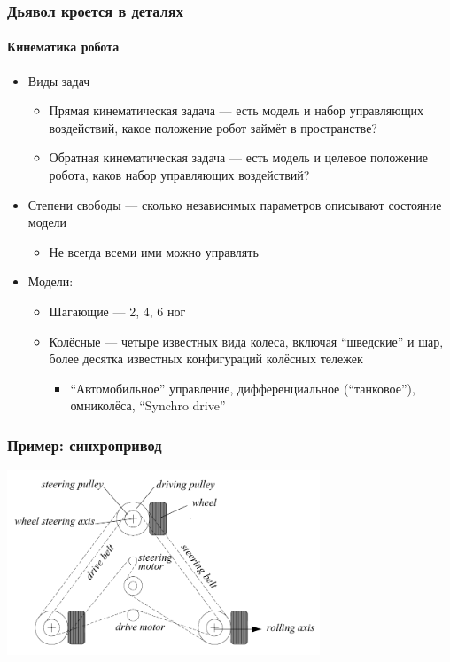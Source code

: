 \documentclass{../../slides-style}
\begin{document}
    \begin{frame}
        \frametitle{Дьявол кроется в деталях}
        \framesubtitle{Кинематика робота}
        \begin{itemize}
            \item Виды задач
            \begin{itemize}
                \item Прямая кинематическая задача --- есть модель и набор управляющих воздействий, какое положение робот займёт в пространстве?
                \item Обратная кинематическая задача --- есть модель и целевое положение робота, каков набор управляющих воздействий?
            \end{itemize}
            \item Степени свободы --- сколько независимых параметров описывают состояние модели
            \begin{itemize}
                \item Не всегда всеми ими можно управлять
            \end{itemize}
            \item Модели:
            \begin{itemize}
                \item Шагающие --- 2, 4, 6 ног
                \item Колёсные --- четыре известных вида колеса, включая \enquote{шведские} и шар, более десятка известных конфигураций колёсных тележек
                \begin{itemize}
                    \item \enquote{Автомобильное} управление, дифференциальное (\enquote{танковое}), омниколёса, \enquote{Synchro drive}
                \end{itemize}
            \end{itemize}
        \end{itemize}
    \end{frame}

    \begin{frame}
        \frametitle{Пример: синхропривод}
        \begin{center}
            \includegraphics[width=0.7\textwidth]{synchroDrive.png}
        \end{center}
    \end{frame}
\end{document}
